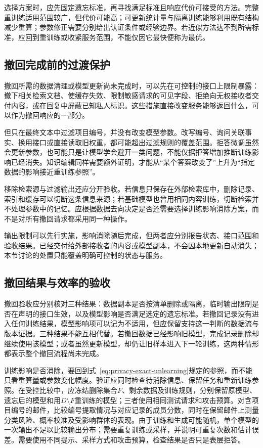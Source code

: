 选择方案时，应先固定遗忘标准，再寻找满足标准且响应代价可接受的方法。完整重训练适用范围较广，但代价可能高；可更新统计量与隔离训练能够利用既有结构减少重算；参数修正需要分别给出认证条件或经验边界。若近似方法达不到所需标准，应回到重训练或收紧服务范围，不能仅因它最快便称为最优。

\subsection{撤回完成前的过渡保护}
\label{sec:privacy-unlearning-output-control}

撤回所需的数据清理或模型更新尚未完成时，可以先在可控制的接口上限制暴露：撤下相关检索文档、使缓存失效、限制敏感请求的可见字段、拒绝向无权接收者交付内容，或在回复中屏蔽已知私人标识。这些措施直接改变服务能够返回什么，可以作为撤回响应的一部分。

但只在最终文本中过滤项目编号，并没有改变模型参数。改写编号、询问关联事实、换用接口或直接读取旧权重，都可能超出过滤规则的覆盖范围。拒答微调虽然会更新参数，也可能只是让模型学会避开一类问题，不能仅据拒答增加推断训练影响已经消失。知识编辑同样需要额外证明，才能从“某个答案改变了”上升为“指定数据的影响接近重训练参照”。

移除检索源与过滤输出还应分开验收。若信息只保存在外部检索库中，删除记录、索引和缓存可以切断这条信息来源；若基础模型也曾用相同内容训练，切断检索并不处理参数中的记忆。应根据数据去向决定是否还需要选择训练影响消除方案，而不是对所有撤回请求都采用同一种操作。

输出限制可以先行实施，影响消除随后完成，但两者应分别报告状态、接口范围和验收结果。已经交付给外部接收者的内容或模型副本，不会因本地更新自动消失；本节讨论的处置只能覆盖明确可控制的状态与服务。

\subsection{撤回结果与效率的验收}
\label{sec:privacy-unlearning-validation}

撤回验收应分别核对三种结果：数据副本是否按清单删除或隔离，临时输出限制是否在声明的接口生效，以及模型影响是否满足选定的遗忘标准。若撤回记录没有进入任何训练结果，模型影响项可以记为不适用，但应保留支持这一判断的数据流与版本证据。三种结果不能互相代替。若撤回数据已经影响旧模型，完成记录删除却继续使用该模型；或者虽然更新模型，却仍让旧样本进入下一轮训练，这两种情形都表示整个撤回流程尚未完成。

训练影响是否消除，要回到式~\eqref{eq:privacy-exact-unlearning}规定的参照，而不能只看重算量或参数变化幅度。验证应同时检查待消除信息、保留任务和重新训练参照。在受控比较中，应冻结删除集合$F$、剩余数据及训练规则，分别保留原模型、遗忘后的模型和用$D\setminus F$重训练的模型；三者使用相同测试请求和攻击预算。对含项目编号的邮件，比较编号提取情况与对应记录的成员分数，同时在保留邮件上测量分类风险、概率校准及受影响群体的表现。由于训练和生成可能随机，单个模型的一次输出不足以比较输出分布；需要重复训练或采样，并说明可重复次数和估计误差。需要使用不同提示、采样方式和攻击预算，检查结果是否只是表层拒答。

